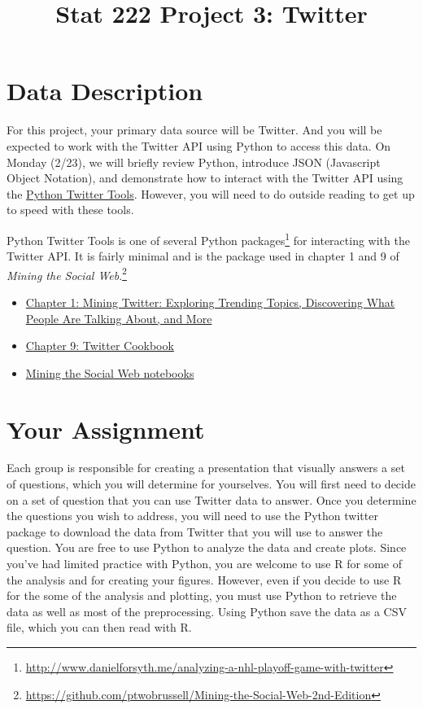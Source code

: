 \documentclass[11pt, oneside]{article}   	%
\title{Stat 222 Project 3: Twitter}
\date{}							%
\begin{document}
\maketitle

\section{Data Description}

For this project, your primary data source will be Twitter.  And you will be
expected to work with the Twitter API using Python to access this data. On
Monday (2/23), we will briefly review Python, introduce JSON (Javascript
Object Notation), and demonstrate how to interact with the Twitter API using
the \href{https://github.com/sixohsix/twitter}{Python Twitter Tools}.  However,
you will need to do outside reading to get up to speed with these
tools. 

Python Twitter Tools is one of several Python
packages\footnote{\url{http://www.danielforsyth.me/analyzing-a-nhl-playoff-game-with-twitter}}
for interacting with the Twitter API.  It is fairly minimal and is the package used in
chapter 1 and 9 of \emph{Mining the Social Web}.\footnote{\url{https://github.com/ptwobrussell/Mining-the-Social-Web-2nd-Edition}}
\begin{itemize}
\item \href{https://rawgit.com/ptwobrussell/Mining-the-Social-Web-2nd-Edition/master/ipynb/html/Chapter%201%20-%20Mining%20Twitter.html}{Chapter 1: Mining Twitter: Exploring Trending Topics, Discovering What People Are Talking About, and More}
\item \href{https://rawgit.com/ptwobrussell/Mining-the-Social-Web-2nd-Edition/master/ipynb/html/Chapter%209%20-%20Twitter%20Cookbook.html}{Chapter 9: Twitter Cookbook}
\item \href{http://nbviewer.ipython.org/github/ptwobrussell/Mining-the-Social-Web-2nd-Edition/tree/master/ipynb/}{Mining the Social Web notebooks}
\end{itemize}



\section{Your Assignment}

Each group is responsible for creating a presentation that visually answers a
set of questions, which you will determine for yourselves.  You will first need
to decide on a set of question that you can use Twitter data to answer.  Once
you determine the questions you wish to address, you will need to use the
Python twitter package to download the data from Twitter that you will use to
answer the question.  You are free to use Python to analyze the data and create
plots.  Since you've had limited practice with Python, you are welcome to use R
for some of the analysis and for creating your figures. However, even if you
decide to use R for the some of the analysis and plotting, you must use Python
to retrieve the data as well as most of the preprocessing.  Using Python save
the data as a CSV file, which you can then read with R.
\end{document}
